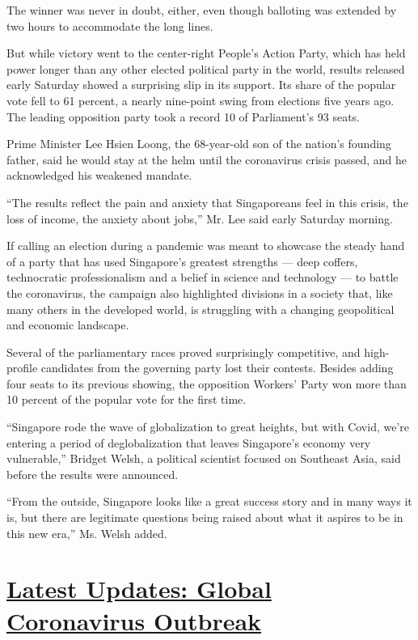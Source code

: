 The winner was never in doubt, either, even though balloting was
extended by two hours to accommodate the long lines.

But while victory went to the center-right People's Action Party, which
has held power longer than any other elected political party in the
world, results released early Saturday showed a surprising slip in its
support. Its share of the popular vote fell to 61 percent, a nearly
nine-point swing from elections five years ago. The leading opposition
party took a record 10 of Parliament's 93 seats.

Prime Minister Lee Hsien Loong, the 68-year-old son of the nation's
founding father, said he would stay at the helm until the coronavirus
crisis passed, and he acknowledged his weakened mandate.

``The results reflect the pain and anxiety that Singaporeans feel in
this crisis, the loss of income, the anxiety about jobs,'' Mr. Lee said
early Saturday morning.

If calling an election during a pandemic was meant to showcase the
steady hand of a party that has used Singapore's greatest strengths ---
deep coffers, technocratic professionalism and a belief in science and
technology --- to battle the coronavirus, the campaign also highlighted
divisions in a society that, like many others in the developed world, is
struggling with a changing geopolitical and economic landscape.

Several of the parliamentary races proved surprisingly competitive, and
high-profile candidates from the governing party lost their contests.
Besides adding four seats to its previous showing, the opposition
Workers' Party won more than 10 percent of the popular vote for the
first time.

``Singapore rode the wave of globalization to great heights, but with
Covid, we're entering a period of deglobalization that leaves
Singapore's economy very vulnerable,'' Bridget Welsh, a political
scientist focused on Southeast Asia, said before the results were
announced.

``From the outside, Singapore looks like a great success story and in
many ways it is, but there are legitimate questions being raised about
what it aspires to be in this new era,'' Ms. Welsh added.

\hypertarget{latest-updates-global-coronavirus-outbreak}{%
\section{\texorpdfstring{\href{https://www.nytimes3xbfgragh.onion/2020/08/01/world/coronavirus-covid-19.html?action=click\&pgtype=Article\&state=default\&region=MAIN_CONTENT_1\&context=storylines_live_updates}{Latest
Updates: Global Coronavirus
Outbreak}}{Latest Updates: Global Coronavirus Outbreak}}\label{latest-updates-global-coronavirus-outbreak}}

